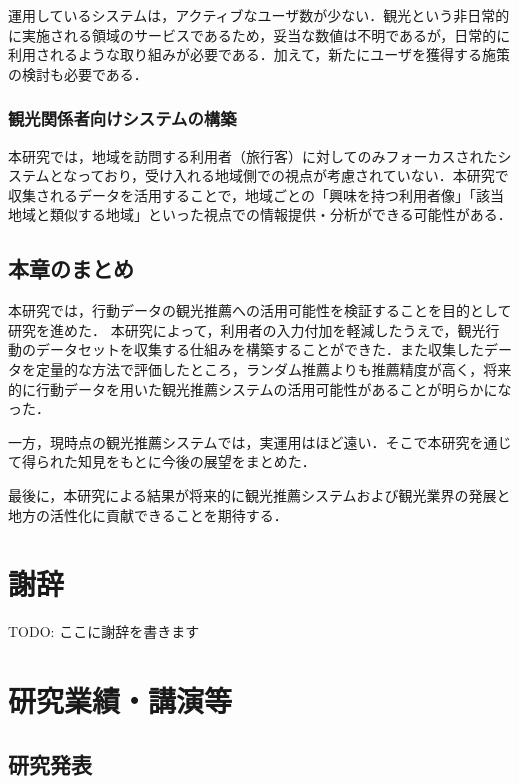 \documentclass{jsarticle}
\begin{document}
運用しているシステムは，アクティブなユーザ数が少ない．観光という非日常的に実施される領域のサービスであるため，妥当な数値は不明であるが，日常的に利用されるような取り組みが必要である．加えて，新たにユーザを獲得する施策の検討も必要である．

\subsubsection{観光関係者向けシステムの構築}

本研究では，地域を訪問する利用者（旅行客）に対してのみフォーカスされたシステムとなっており，受け入れる地域側での視点が考慮されていない．本研究で収集されるデータを活用することで，地域ごとの「興味を持つ利用者像」「該当地域と類似する地域」といった視点での情報提供・分析ができる可能性がある．

\subsection{本章のまとめ}

本研究では，行動データの観光推薦への活用可能性を検証することを目的として研究を進めた．
本研究によって，利用者の入力付加を軽減したうえで，観光行動のデータセットを収集する仕組みを構築することができた．また収集したデータを定量的な方法で評価したところ，ランダム推薦よりも推薦精度が高く，将来的に行動データを用いた観光推薦システムの活用可能性があることが明らかになった．

一方，現時点の観光推薦システムでは，実運用はほど遠い．そこで本研究を通じて得られた知見をもとに今後の展望をまとめた．

最後に，本研究による結果が将来的に観光推薦システムおよび観光業界の発展と地方の活性化に貢献できることを期待する．

\newpage

\section*{謝辞}

TODO: ここに謝辞を書きます

\newpage

\section*{研究業績・講演等}

\subsection*{研究発表}
\end{document}
